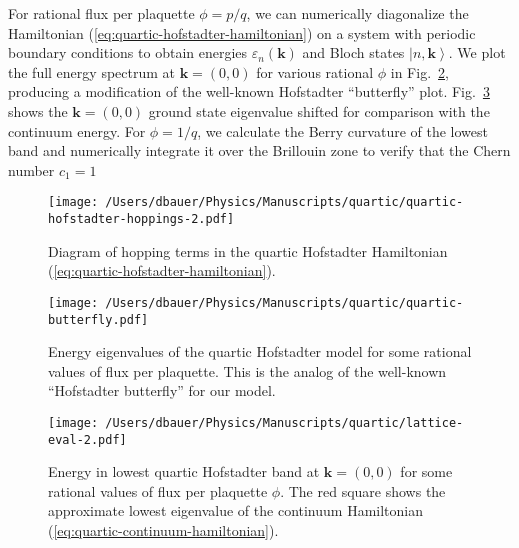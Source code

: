 \documentclass[aps,twocolumn,letterpaper,twoside,nobalancelastpage,groupedaddress,amsmath,amssymb,floatfix,citeautoscript]{revtex4-1}
\begin{document}
For rational flux per plaquette $\phi = p/q$, we can numerically diagonalize the Hamiltonian (\ref{eq:quartic-hofstadter-hamiltonian}) on a system with periodic boundary conditions to obtain energies $\varepsilon_n(\mathbf{k})$ and Bloch states $\left|n,\mathbf{k}\right>$. We plot the full energy spectrum at $\mathbf{k}=(0,0)$ for various rational $\phi$ in Fig.~\ref{fig:butterfly}, producing a modification of the well-known Hofstadter ``butterfly'' plot. Fig.~\ref{fig:ground-state} shows the $\mathbf{k}=(0,0)$ ground state eigenvalue shifted for comparison with the continuum energy. For $\phi=1/q$, we calculate the Berry curvature of the lowest band and numerically integrate it over the Brillouin zone to verify that the Chern number $c_1=1$

\begin{figure}[bht]
\centering
\texttt{[image: /Users/dbauer/Physics/Manuscripts/quartic/quartic-hofstadter-hoppings-2.pdf]}
\caption{\label{fig:hopping}Diagram of hopping terms in the quartic Hofstadter Hamiltonian (\ref{eq:quartic-hofstadter-hamiltonian}).}
\end{figure}

\begin{figure}[bht]
\centering
\texttt{[image: /Users/dbauer/Physics/Manuscripts/quartic/quartic-butterfly.pdf]}
\caption{\label{fig:butterfly} Energy eigenvalues of the quartic Hofstadter model for some rational values of flux per plaquette. This is the analog of the well-known ``Hofstadter butterfly'' for our model.}
\end{figure}



\begin{figure}[bht]
\centering
\texttt{[image: /Users/dbauer/Physics/Manuscripts/quartic/lattice-eval-2.pdf]}
\caption{\label{fig:ground-state} Energy in lowest quartic Hofstadter band at $\mathbf{k}=(0,0)$ for some rational values of flux per plaquette $\phi$. The red square shows the approximate lowest eigenvalue of the continuum Hamiltonian (\ref{eq:quartic-continuum-hamiltonian}).}
\end{figure}
\end{document}
